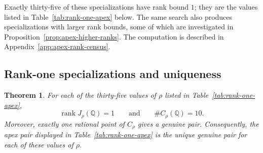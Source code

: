 \documentclass[11pt]{amsart}
\theoremstyle{plain}
\newtheorem{thm}{Theorem}[section]
\theoremstyle{remark}
\theoremstyle{plain}
\newcommand{\Q}{\mathbb{Q}}
\begin{document}
Exactly thirty-five of these specializations have rank bound $1$;
they are the values listed in Table~\ref{tab:rank-one-apex} below.
The same search also produces specializations with larger rank bounds,
some of which are investigated in Proposition~\ref{prop:apex-higher-ranks}.
The computation is described in
Appendix~\ref{app:apex-rank-census}.


\subsection{Rank-one specializations and uniqueness}

\begin{thm}\label{thm:rank-one-apex}
For each of the thirty-five values of $\rho$ listed in
Table~\ref{tab:rank-one-apex},
\[
\operatorname{rank}J_\rho(\Q)=1
\qquad\text{and}\qquad
\#C_\rho(\Q)=10.
\]
Moreover, exactly one rational point of $C_\rho$ gives a genuine pair.
Consequently, the apex pair displayed in
Table~\ref{tab:rank-one-apex} is the unique genuine pair for each of
these values of $\rho$.
\end{thm}
\end{document}
